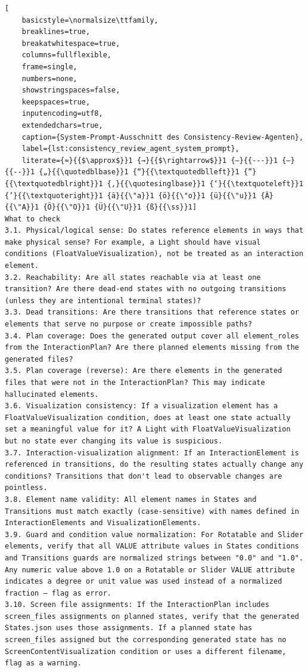 \begin{lstlisting}[
	basicstyle=\normalsize\ttfamily,
	breaklines=true,
	breakatwhitespace=true,
	columns=fullflexible,
	frame=single,
	numbers=none,
	showstringspaces=false,
	keepspaces=true,
	inputencoding=utf8,
	extendedchars=true,
	caption={System-Prompt-Ausschnitt des Consistency-Review-Agenten},
	label={lst:consistency_review_agent_system_prompt},
	literate={≈}{{$\approx$}}1 {→}{{$\rightarrow$}}1 {—}{{---}}1 {–}{{--}}1 {„}{{\quotedblbase}}1 {“}{{\textquotedblleft}}1 {”}{{\textquotedblright}}1 {‚}{{\quotesinglbase}}1 {‘}{{\textquoteleft}}1 {’}{{\textquoteright}}1 {ä}{{\"a}}1 {ö}{{\"o}}1 {ü}{{\"u}}1 {Ä}{{\"A}}1 {Ö}{{\"O}}1 {Ü}{{\"U}}1 {ß}{{\ss}}1]
What to check
3.1. Physical/logical sense: Do states reference elements in ways that make physical sense? For example, a Light should have visual conditions (FloatValueVisualization), not be treated as an interaction element.
3.2. Reachability: Are all states reachable via at least one transition? Are there dead-end states with no outgoing transitions (unless they are intentional terminal states)?
3.3. Dead transitions: Are there transitions that reference states or elements that serve no purpose or create impossible paths?
3.4. Plan coverage: Does the generated output cover all element_roles from the InteractionPlan? Are there planned elements missing from the generated files?
3.5. Plan coverage (reverse): Are there elements in the generated files that were not in the InteractionPlan? This may indicate hallucinated elements.
3.6. Visualization consistency: If a visualization element has a FloatValueVisualization condition, does at least one state actually set a meaningful value for it? A Light with FloatValueVisualization but no state ever changing its value is suspicious.
3.7. Interaction-visualization alignment: If an InteractionElement is referenced in transitions, do the resulting states actually change any conditions? Transitions that don't lead to observable changes are pointless.
3.8. Element name validity: All element names in States and Transitions must match exactly (case-sensitive) with names defined in InteractionElements and VisualizationElements.
3.9. Guard and condition value normalization: For Rotatable and Slider elements, verify that all VALUE attribute values in States conditions and Transitions guards are normalized strings between "0.0" and "1.0". Any numeric value above 1.0 on a Rotatable or Slider VALUE attribute indicates a degree or unit value was used instead of a normalized fraction — flag as error.
3.10. Screen file assignments: If the InteractionPlan includes screen_files assignments on planned states, verify that the generated States.json uses those assignments. If a planned state has screen_files assigned but the corresponding generated state has no ScreenContentVisualization condition or uses a different filename, flag as a warning.

\end{lstlisting}
